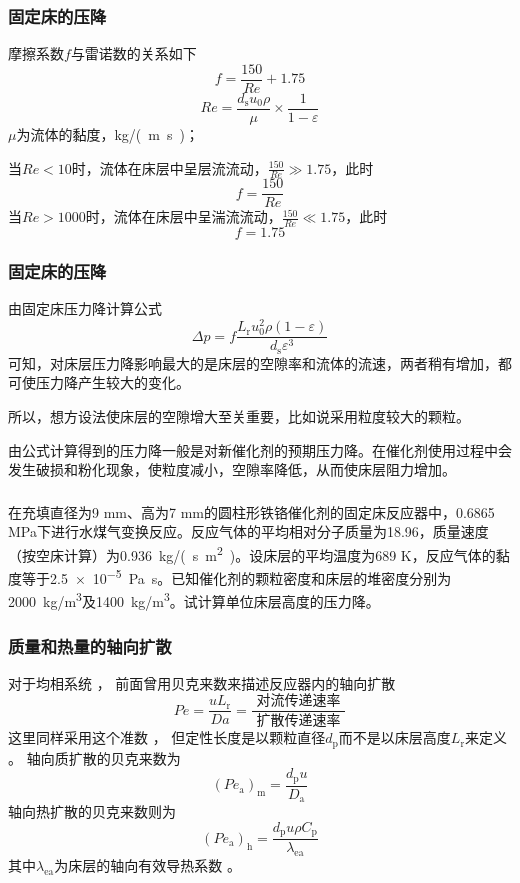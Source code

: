 \begin{frame}
    \frametitle{固定床的压降}

    摩擦系数$f$与雷诺数的关系如下
    \[
        f=\frac{150}{Re}+1.75
    \]
    \[
        R e=\frac{d_{\mathrm{s}} u_{0} \rho}{\mu} \times \frac{1}{1-\varepsilon}
    \]
    $\mu$为流体的黏度，\si{kg/(m.s)}；

    当$Re<10$时，流体在床层中呈层流流动，$\frac{150}{Re} \gg 1.75$，此时
    \[
        f=\frac{150}{Re}
    \]
    当$Re>1000$时，流体在床层中呈湍流流动，$\frac{150}{Re} \ll 1.75$，此时
    \[
        f=1.75
    \]

\end{frame}


\begin{frame}
    \frametitle{固定床的压降}

    由固定床压力降计算公式
    \[
        \Delta p=f \frac{L_{\mathrm{r}} u_0^{2} \rho(1-\varepsilon)}{d_{\mathrm{s}} \varepsilon^{3}}
    \]
    可知，对床层压力降影响最大的是床层的空隙率和流体的流速，两者稍有增加，都可使压力降产生较大的变化。
    
    所以，想方设法使床层的空隙增大至关重要，比如说采用粒度较大的颗粒。
    
    由公式计算得到的压力降一般是对新催化剂的预期压力降。在催化剂使用过程中会发生破损和粉化现象，使粒度减小，空隙率降低，从而使床层阻力增加。

    

\end{frame}


\begin{frame}[t]
    \frametitle{}

    \begin{example}
        在充填直径为9 mm、高为7 mm的圆柱形铁铬催化剂的固定床反应器中，0.6865 MPa下进行水煤气变换反应。反应气体的平均相对分子质量为18.96，质量速度（按空床计算）为\SI{0.936}{kg/(s.m^2)}。设床层的平均温度为689 K，反应气体的黏度等于\SI{2.5e-5}{Pa.s}。已知催化剂的颗粒密度和床层的堆密度分别为\SI{2000}{kg/m^3}及\SI{1400}{kg/m^3}。试计算单位床层高度的压力降。
    \end{example}

\end{frame}


\begin{frame}
    \frametitle{质量和热量的轴向扩散}
    对于均相系统 ， 前面曾用贝克来数来描述反应器内的轴向扩散
    \[
        P e=\frac{u L_{\mathrm{r}}}{D a}=\frac{\text { 对流传递速率 }}{\text { 扩散传递速率 }}
    \]
    这里同样采用这个准数 ， 但定性长度是以颗粒直径$d_\mathrm{p}$而不是以床层高度$L_{\mathrm{r}}$来定义 。 轴向质扩散的贝克来数为
    \[
        (P e_\mathrm{a})_\mathrm{m}=\frac{d_\mathrm{p}u}{D_\mathrm{a}}
    \]
    轴向热扩散的贝克来数则为
    \[
        (P e_\mathrm{a})_\mathrm{h}=\frac{d_\mathrm{p}u\rho C_\mathrm{p}}{\lambda_\mathrm{ea}}
    \]
    其中$\lambda_\mathrm{ea}$为床层的轴向有效导热系数 。
\end{frame}


